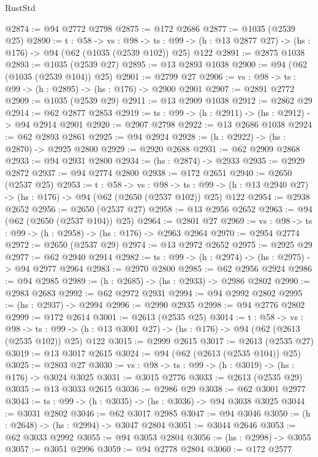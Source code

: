 \begin{lexlean}{RustStd}
\begin{coremodule}
{\begin{coremodule}
{{{{{{@2874 := @94 @2772 @2798
@2875 := @172 @2686
@2877 := @1035 (@2539 @25)
@2890 := {t : @58} ->
  {vs : @98} ->
  {ts : @99} -> (h : @13 @2877 @27) -> (hs : @176) -> @94 (@62 (@1035 (@2539 @102)) @25) @122
@2891 := @2875 @1038
@2893 := @1035 (@2539 @27)
@2895 := @13 @2893 @1038
@2900 := @94 (@62 (@1035 (@2539 @104)) @25)
@2901 := @2799 @27
@2906 := {vs : @98} -> {ts : @99} -> (h : @2895) -> (hs : @176) -> @2900 @2901
@2907 := @2891 @2772
@2909 := @1035 (@2539 @29)
@2911 := @13 @2909 @1038
@2912 := @2862 @29
@2914 := @62 @2877 @2853
@2919 := {ts : @99} -> (h : @2911) -> (hs : @2912) -> @94 @2914 @2901
@2920 := @2907 @2798
@2922 := @13 @2686 @1038
@2924 := @62 @2893 @2861
@2925 := @94 @2924
@2928 := (h : @2922) -> (hs : @2870) -> @2925 @2800
@2929 := @2920 @2688
@2931 := @62 @2909 @2868
@2933 := @94 @2931 @2800
@2934 := (hs : @2874) -> @2933
@2935 := @2929 @2872
@2937 := @94 @2774 @2800
@2938 := @172 @2651
@2940 := @2650 (@2537 @25)
@2953 := {t : @58} ->
  {vs : @98} ->
  {ts : @99} -> (h : @13 @2940 @27) -> (hs : @176) -> @94 (@62 (@2650 (@2537 @102)) @25) @122
@2954 := @2938 @2652
@2956 := @2650 (@2537 @27)
@2958 := @13 @2956 @2652
@2963 := @94 (@62 (@2650 (@2537 @104)) @25)
@2964 := @2801 @27
@2969 := {vs : @98} -> {ts : @99} -> (h : @2958) -> (hs : @176) -> @2963 @2964
@2970 := @2954 @2774
@2972 := @2650 (@2537 @29)
@2974 := @13 @2972 @2652
@2975 := @2925 @29
@2977 := @62 @2940 @2914
@2982 := {ts : @99} -> (h : @2974) -> (hs : @2975) -> @94 @2977 @2964
@2983 := @2970 @2800
@2985 := @62 @2956 @2924
@2986 := @94 @2985
@2989 := (h : @2685) -> (hs : @2933) -> @2986 @2802
@2990 := @2983 @2683
@2992 := @62 @2972 @2931
@2994 := @94 @2992 @2802
@2995 := (hs : @2937) -> @2994
@2996 := @2990 @2935
@2998 := @94 @2776 @2802
@2999 := @172 @2614
@3001 := @2613 (@2535 @25)
@3014 := {t : @58} ->
  {vs : @98} ->
  {ts : @99} -> (h : @13 @3001 @27) -> (hs : @176) -> @94 (@62 (@2613 (@2535 @102)) @25) @122
@3015 := @2999 @2615
@3017 := @2613 (@2535 @27)
@3019 := @13 @3017 @2615
@3024 := @94 (@62 (@2613 (@2535 @104)) @25)
@3025 := @2803 @27
@3030 := {vs : @98} -> {ts : @99} -> (h : @3019) -> (hs : @176) -> @3024 @3025
@3031 := @3015 @2776
@3033 := @2613 (@2535 @29)
@3035 := @13 @3033 @2615
@3036 := @2986 @29
@3038 := @62 @3001 @2977
@3043 := {ts : @99} -> (h : @3035) -> (hs : @3036) -> @94 @3038 @3025
@3044 := @3031 @2802
@3046 := @62 @3017 @2985
@3047 := @94 @3046
@3050 := (h : @2648) -> (hs : @2994) -> @3047 @2804
@3051 := @3044 @2646
@3053 := @62 @3033 @2992
@3055 := @94 @3053 @2804
@3056 := (hs : @2998) -> @3055
@3057 := @3051 @2996
@3059 := @94 @2778 @2804
@3060 := @172 @2577
}}}}}}
\end{coremodule}}
\end{coremodule}
\end{lexlean}

